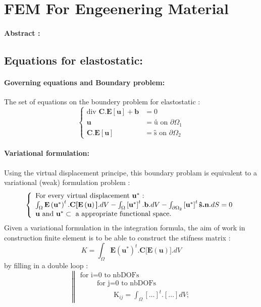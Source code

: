 \documentclass[a4paper,10pt]{article}
\begin{document}
\section{FEM For Engeenering Material}

\paragraph{Abstract : }

\subsection{Equations for elastostatic: } 

\paragraph{Governing equations and Boundary problem: }
The set of equations on the boundery problem for elastostatic :
\[
\left\{
\begin{array}{rl}
 \text{div }\textbf{C.E} \left[ \textbf{u} \right] + \textbf{b} & =0 \\
                                       \textbf{u} & = \textbf{\^{u}} \text{         on $\partial\Omega_1 $}\\
           \textbf{C.E} \left[ \textbf{u} \right] &= \textbf{\^{s}}  \text{         on $\partial\Omega_2 $}
\end{array}\right.
\]
\paragraph{Variational formulation: }
Using the virtual displacement principe, this boundary problam is equivalent to a variational (weak) formulation problem :
\[
\left\{
\begin{array}{l}
\text {For every virtual displacement \textbf{u}$^*$ :} \\
  \int_{\Omega}\textbf{E}\left(\textbf{u}^*\right) ^t .\textbf{C[E} \left( \textbf{u} \right) \textbf{]} .dV
 -\int_{\Omega}\left[\textbf{u}^*\right]^t . \textbf{b} .dV
 -\int_{\partial\Omega_2}\left[\textbf{u}^* \right]^t \textbf{\^{s}.n} .dS  =0 \\
                                      
 \textbf{u} \text{ and } \textbf{u}^*\subset \text{ a appropriate functional space.}
\end{array}\right.
\]
Given a variational formulation in the integration formula, the aim of work in construction finite element is to be able to construct the stifness matrix :
\[
 K=\int_{\Omega}\textbf{E}\left(\textbf{u}^*\right) ^t .\textbf{C[E} \left( \textbf{u} \right) \textbf{]} .dV
\]
by filling in a double loop :
\[
\left\|
\begin{array}{l}
\text{for i=0 to nbDOFs} \\ 
\hspace{1cm} \text{for j=0 to nbDOFs} \\
\hspace{2cm} \text{K}_{ij} = \int_{\Omega} [...]^t .[...]dV  ;
\end{array}
\right.
\]
\end{document}
